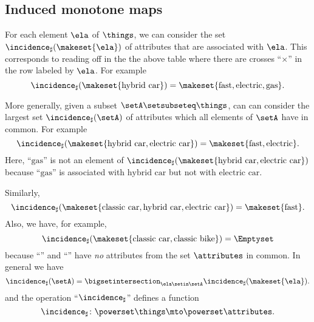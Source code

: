 \subsection{Induced monotone maps}

For each element $\ela$ of $\things$, we can consider the set $\incidence_\sharp(\makeset{\ela})$ of attributes that are associated with $\ela$.
This corresponds to reading off in the the above table where there are crosses ``$\times$'' in the row labeled by $\ela$.
For example
\begin{equation}\label{eq:fca-example-pushforward-1}
    \incidence_\sharp(\makeset{\text{hybrid car}}) = \makeset{\text{fast}, \text{electric}, \text{gas}}.
\end{equation}

More generally, given a subset $\setA \setsubseteq \things$, can can consider the largest set $\incidence_\sharp(\setA)$ of attributes which all elements of $\setA$ have in common.
For example
\begin{equation}\label{eq:fca-example-pushforward-2}
    \incidence_\sharp(\makeset{\text{hybrid car}, \text{electric car}}) = \makeset{\text{fast}, \text{electric}}.
\end{equation}
Here, ``$\text{gas}$'' is not an element of $\incidence_\sharp(\makeset{\text{hybrid car}, \text{electric car}})$ because ``$\text{gas}$'' is associated with $\text{hybrid car}$ but not with $\text{electric car}$.

Similarly,
\begin{equation}\label{eq:fca-example-pushforward-3}
    \incidence_\sharp(\makeset{\text{classic car}, \text{hybrid car}, \text{electric car}}) = \makeset{\text{fast}}.
\end{equation}
Also, we have, for example,
\begin{equation}\label{eq:fca-example-pushforward-4}
    \incidence_\sharp(\makeset{\text{classic car}, \text{classic bike}}) = \Emptyset
\end{equation}
because ``'' and ``'' have \emph{no} attributes from the set $\attributes$ in common.
In general we have
\begin{equation}\label{eq:fca-example-pushforward-5}
    \incidence_\sharp(\setA) = \bigsetintersection_{\ela \setin \setA} \incidence_\sharp(\makeset{\ela}).
\end{equation}
and the operation ``$\incidence_\sharp$'' defines a function
\begin{equation}\label{eq:fca-example-pushforward-6}
    \incidence_\sharp \colon \powerset \things \mto \powerset \attributes.
\end{equation}

